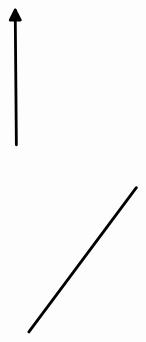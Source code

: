 \documentclass[10pt]{article}
\theoremstyle{plain}
\theoremstyle{remark}
\begin{document}
\[\begin{pgfpicture}
\begin{pgfscope}
\pgfpathlineto{\pgfqpoint{0.546848in}{3.658471in}}%
\pgfpathlineto{\pgfqpoint{0.466567in}{3.598847in}}%
\pgfpathclose%
\pgfusepath{stroke,fill}%
\end{pgfscope}%
\begin{pgfscope}%
\pgfpathrectangle{\pgfqpoint{0.242589in}{0.187957in}}{\pgfqpoint{2.799137in}{5.640000in}} %
\pgfusepath{clip}%
\pgfsetroundcap%
\pgfsetroundjoin%
\pgfsetlinewidth{2.007500pt}%
\definecolor{currentstroke}{rgb}{0.000000,0.000000,0.000000}%
\pgfsetstrokecolor{currentstroke}%
\pgfsetdash{}{0pt}%
\pgfpathmoveto{\pgfqpoint{1.647214in}{4.133434in}}%
\pgfpathquadraticcurveto{\pgfqpoint{1.641360in}{4.815647in}}{\pgfqpoint{1.635771in}{5.466804in}}%
\pgfusepath{stroke}%
\end{pgfscope}%
\begin{pgfscope}%
\pgfpathrectangle{\pgfqpoint{0.242589in}{0.187957in}}{\pgfqpoint{2.799137in}{5.640000in}} %
\pgfusepath{clip}%
\pgfsetroundcap%
\pgfsetroundjoin%
\definecolor{currentfill}{rgb}{0.000000,0.000000,0.000000}%
\pgfsetfillcolor{currentfill}%
\pgfsetlinewidth{2.007500pt}%
\definecolor{currentstroke}{rgb}{0.000000,0.000000,0.000000}%
\pgfsetstrokecolor{currentstroke}%
\pgfsetdash{}{0pt}%
\pgfpathmoveto{\pgfqpoint{1.586631in}{5.366379in}}%
\pgfpathlineto{\pgfqpoint{1.635771in}{5.466804in}}%
\pgfpathlineto{\pgfqpoint{1.686628in}{5.367237in}}%
\pgfpathlineto{\pgfqpoint{1.586631in}{5.366379in}}%
\pgfpathclose%
\pgfusepath{stroke,fill}%
\end{pgfscope}%
\begin{pgfscope}%
\pgfpathrectangle{\pgfqpoint{0.242589in}{0.187957in}}{\pgfqpoint{2.799137in}{5.640000in}} %
\pgfusepath{clip}%
\pgfsetroundcap%
\pgfsetroundjoin%
\pgfsetlinewidth{2.007500pt}%
\definecolor{currentstroke}{rgb}{0.000000,0.000000,0.000000}%
\pgfsetstrokecolor{currentstroke}%
\pgfsetdash{}{0pt}%
\pgfpathmoveto{\pgfqpoint{1.771513in}{2.281719in}}%
\pgfpathquadraticcurveto{\pgfqpoint{2.313434in}{3.007952in}}{\pgfqpoint{2.836782in}{3.709294in}}%
\pgfusepath{stroke}%
\end{pgfscope}%
\begin{pgfscope}%
\pgfpathrectangle{\pgfqpoint{0.242589in}{0.187957in}}{\pgfqpoint{2.799137in}{5.640000in}} %
\pgfusepath{clip}%
\pgfsetroundcap%
\pgfsetroundjoin%
\definecolor{currentfill}{rgb}{0.000000,0.000000,0.000000}%
\pgfsetfillcolor{currentfill}%
\pgfsetlinewidth{2.007500pt}%
\definecolor{currentstroke}{rgb}{0.000000,0.000000,0.000000}%
\pgfsetstrokecolor{currentstroke}%
\pgfsetdash{}{0pt}%
\pgfpathmoveto{\pgfqpoint{2.736904in}{3.659051in}}%
\pgfpathlineto{\pgfqpoint{2.836782in}{3.709294in}}%

\end{pgfscope}
\end{pgfpicture}\]
\end{document}
